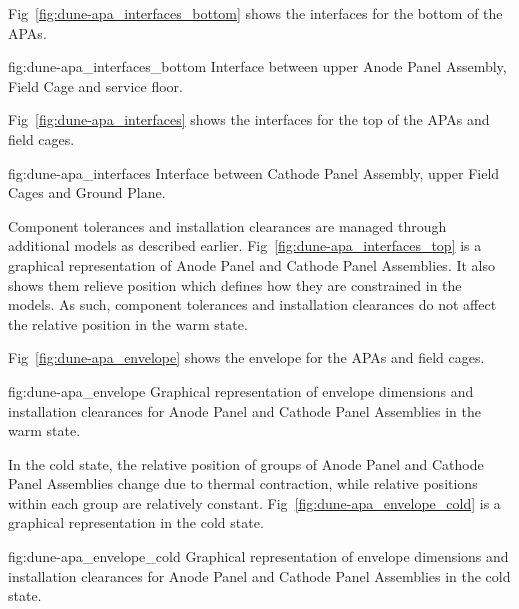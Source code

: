 Fig~\ref{fig:dune-apa_interfaces_bottom} shows the interfaces for the bottom of the APAs.
\begin{dunefigure}{fig:dune-apa_interfaces_bottom}
  {Interface between upper Anode Panel Assembly, Field Cage and service floor.}
\end{dunefigure}

Fig~\ref{fig:dune-apa_interfaces} shows the interfaces for the top of the APAs and field cages.
\begin{dunefigure}{fig:dune-apa_interfaces}
  {Interface between Cathode Panel Assembly, upper Field Cages and Ground Plane.}
\end{dunefigure}

Component tolerances and installation clearances are managed through
additional models as described
earlier. Fig~\ref{fig:dune-apa_interfaces_top} is a graphical
representation of Anode Panel and Cathode Panel Assemblies. It also
shows them relieve position which defines how they are constrained in
the models. As such, component tolerances and installation clearances
do not affect the relative position in the warm state.

Fig~\ref{fig:dune-apa_envelope} shows the envelope for the APAs and field cages.
\begin{dunefigure}{fig:dune-apa_envelope} {Graphical
    representation of envelope dimensions and installation clearances
    for Anode Panel and Cathode Panel Assemblies in the warm state.}
\end{dunefigure}


In the cold state, the relative position of groups of Anode Panel and
Cathode Panel Assemblies change due to thermal contraction, while
relative positions within each group are relatively
constant. Fig~\ref{fig:dune-apa_envelope_cold} is a graphical
representation in the cold state.
\begin{dunefigure}{fig:dune-apa_envelope_cold} {Graphical
    representation of envelope dimensions and installation clearances
    for Anode Panel and Cathode Panel Assemblies in the cold state.}
\end{dunefigure}

